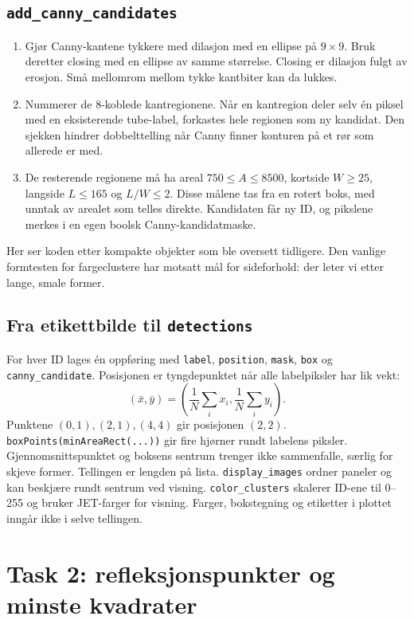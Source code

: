 \documentclass[11pt,a4paper]{article}
\newcommand{\code}[1]{\texttt{#1}}
\begin{document}
\subsection*{\texttt{add\_canny\_candidates}}
\begin{enumerate}
\item Gjør Canny-kantene tykkere med dilasjon med en ellipse på $9\times9$. Bruk deretter closing med en ellipse av samme størrelse. Closing er dilasjon fulgt av erosjon. Små mellomrom mellom tykke kantbiter kan da lukkes.
\item Nummerer de 8-koblede kantregionene. Når en kantregion deler selv én piksel med en eksisterende tube-label, forkastes hele regionen som ny kandidat. Den sjekken hindrer dobbelttelling når Canny finner konturen på et rør som allerede er med.
\item De resterende regionene må ha areal $750\leq A\leq8500$, kortside $W\geq25$, langside $L\leq165$ og $L/W\leq2$. Disse målene tas fra en rotert boks, med unntak av arealet som telles direkte. Kandidaten får ny ID, og pikslene merkes i en egen boolsk Canny-kandidatmaske.
\end{enumerate}
Her ser koden etter kompakte objekter som ble oversett tidligere. Den vanlige formtesten for fargeclustere har motsatt mål for sideforhold: der leter vi etter lange, smale former.

\subsection*{Fra etikettbilde til \texttt{detections}}
For hver ID lages én oppføring med \code{label}, \code{position}, \code{mask}, \code{box} og \code{canny\_candidate}. Posisjonen er tyngdepunktet når alle labelpiksler har lik vekt:
\[
 (\bar x,\bar y)=\left(\frac{1}{N}\sum_i x_i,\frac{1}{N}\sum_i y_i\right).
\]
Punktene $(0,1),(2,1),(4,4)$ gir posisjonen $(2,2)$. \code{boxPoints(minAreaRect(...))} gir fire hjørner rundt labelens piksler. Gjennomsnittspunktet og boksens sentrum trenger ikke sammenfalle, særlig for skjeve former. Tellingen er lengden på lista. \code{display\_images} ordner paneler og kan beskjære rundt sentrum ved visning. \code{color\_clusters} skalerer ID-ene til 0--255 og bruker JET-farger for visning. Farger, bokstegning og etiketter i plottet inngår ikke i selve tellingen.

\newpage
\section{Task 2: refleksjonspunkter og minste kvadrater}
\end{document}
